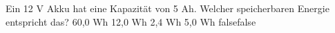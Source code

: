    {Ein 12 V Akku hat eine Kapazität von 5 Ah. Welcher speicherbaren Energie entspricht das?}
    {60,0 Wh}
    {12,0 Wh}
    {2,4 Wh}
    {5,0 Wh}
    {false}{false}